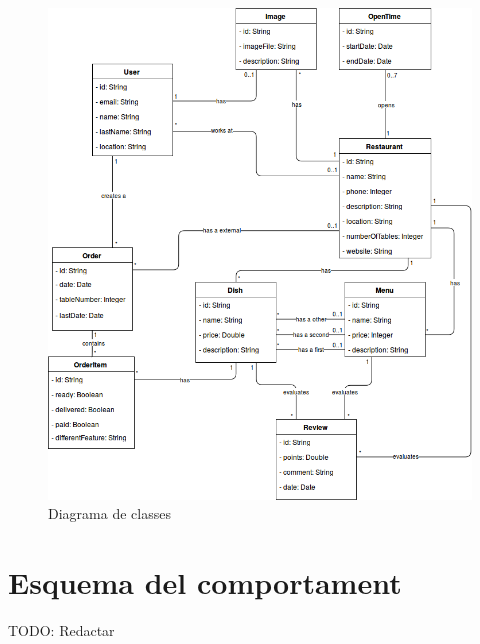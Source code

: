 \begin{figure}[!h]
\centering
\includegraphics[scale=0.5]{Figures/diagrama_clases.png}
\caption{Diagrama de classes}
\end{figure}


\clearpage
\section{Esquema del comportament}

TODO: Redactar